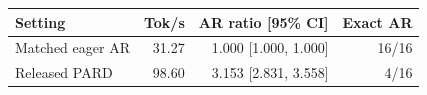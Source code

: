 \begin{tabular}{lrrr}
\toprule
Setting & Tok/s & AR ratio [95\% CI] & Exact AR \\
\midrule
Matched eager AR & 31.27 & 1.000 [1.000, 1.000] & 16/16 \\
Released PARD & 98.60 & 3.153 [2.831, 3.558] & 4/16 \\
\bottomrule
\end{tabular}
